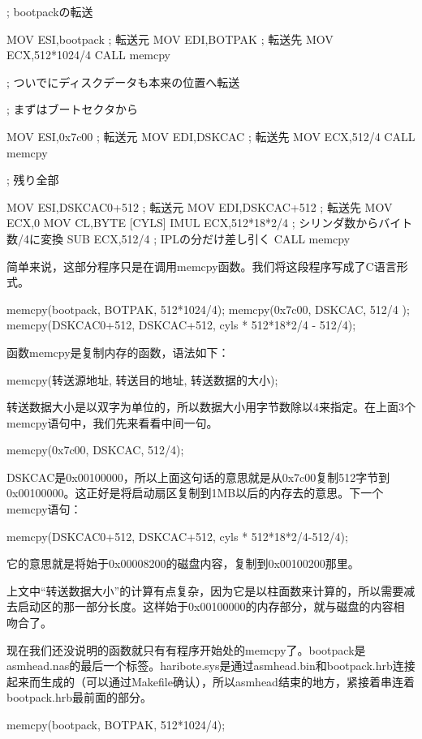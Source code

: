 \cs


\begin{code}[label=asmhead.nas节选（续）]
; bootpackの転送

		MOV		ESI,bootpack	; 転送元
		MOV		EDI,BOTPAK		; 転送先
		MOV		ECX,512*1024/4
		CALL	memcpy

; ついでにディスクデータも本来の位置へ転送

; まずはブートセクタから

		MOV		ESI,0x7c00		; 転送元
		MOV		EDI,DSKCAC		; 転送先
		MOV		ECX,512/4
		CALL	memcpy

; 残り全部

		MOV		ESI,DSKCAC0+512	; 転送元
		MOV		EDI,DSKCAC+512	; 転送先
		MOV		ECX,0
		MOV		CL,BYTE [CYLS]
		IMUL	ECX,512*18*2/4	; シリンダ数からバイト数/4に変換
		SUB		ECX,512/4		; IPLの分だけ差し引く
		CALL	memcpy
\end{code}

简单来说，这部分程序只是在调用memcpy函数。我们将这段程序写成了C语言形式。
\begin{code}
memcpy(bootpack,    BOTPAK,     512*1024/4);
memcpy(0x7c00,      DSKCAC,     512/4     );
memcpy(DSKCAC0+512, DSKCAC+512, cyls * 512*18*2/4 - 512/4);
\end{code}

函数memcpy是复制内存的函数，语法如下：

memcpy(转送源地址, 转送目的地址, 转送数据的大小);

转送数据大小是以双字为单位的，所以数据大小用字节数除以4来指定。在上面3个memcpy语句中，我们先来看看中间一句。

memcpy(0x7c00, DSKCAC, 512/4);

DSKCAC是0x00100000，所以上面这句话的意思就是从0x7c00复制512字节到0x00100000。这正好是将启动扇区复制到1MB以后的内存去的意思。下一个memcpy语句：

memcpy(DSKCAC0+512, DSKCAC+512, cyls * 512*18*2/4-512/4);

它的意思就是将始于0x00008200的磁盘内容，复制到0x00100200那里。

上文中“转送数据大小”的计算有点复杂，因为它是以柱面数来计算的，所以需要减去启动区的那一部分长度。这样始于0x00100000的内存部分，就与磁盘的内容相吻合了。


现在我们还没说明的函数就只有有程序开始处的memcpy了。bootpack是asmhead.nas的最后一个标签。haribote.sys是通过asmhead.bin和bootpack.hrb连接起来而生成的（可以通过Makefile确认），所以asmhead结束的地方，紧接着串连着bootpack.hrb最前面的部分。

memcpy(bootpack, BOTPAK, 512*1024/4);

